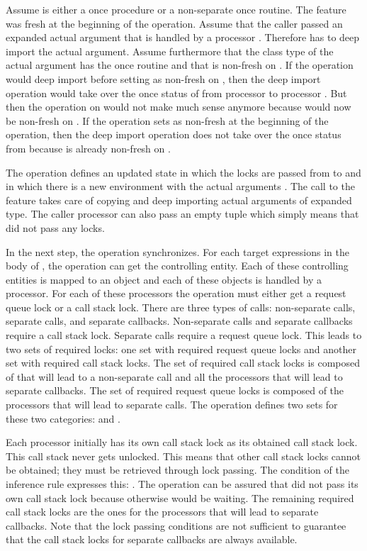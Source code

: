 \begin{clarification}
Assume  is either a once procedure or a non-separate once routine. The feature  was fresh at the beginning of the  operation. Assume that the caller passed an expanded actual argument that is handled by a processor . Therefore  has to deep import the actual argument. Assume furthermore that the class type of the actual argument has the once routine  and that  is non-fresh on . If the operation would deep import before setting  as non-fresh on , then the deep import operation would take over the once status of  from processor  to processor . But then the  operation on  would not make much sense anymore because  would now be non-fresh on . If the operation sets  as non-fresh at the beginning of the  operation, then the deep import operation does not take over the once status from  because  is already non-fresh on .
\end{clarification}

The operation defines an updated state  in which the locks are passed from  to  and in which there is a new environment with the actual arguments . The call to the  feature takes care of copying and deep importing actual arguments of expanded type. The caller processor  can also pass an empty tuple  which simply means that  did not pass any locks.

In the next step, the operation synchronizes. For each target expressions in the body of , the operation can get the controlling entity. Each of these controlling entities is mapped to an object and each of these objects is handled by a processor. For each of these processors the operation must either get a request queue lock or a call stack lock. There are three types of calls: non-separate calls, separate calls, and separate callbacks. Non-separate calls and separate callbacks require a call stack lock. Separate calls require a request queue lock. This leads to two sets of required locks: one set with required request queue locks and another set with required call stack locks. The set of required call stack locks is composed of  that will lead to a non-separate call and all the processors that will lead to separate callbacks. The set of required request queue locks is composed of the processors that will lead to separate calls. The operation defines two sets for these two categories:  and .

Each processor initially has its own call stack lock as its obtained call stack lock. This call stack never gets unlocked. This means that other call stack locks cannot be obtained; they must be retrieved through lock passing. The condition of the inference rule expresses this: . The operation can be assured that  did not pass its own call stack lock because otherwise  would be waiting. The remaining required call stack locks are the ones for the processors that will lead to separate callbacks. Note that the lock passing conditions are not sufficient to guarantee that the call stack locks for separate callbacks are always available.

